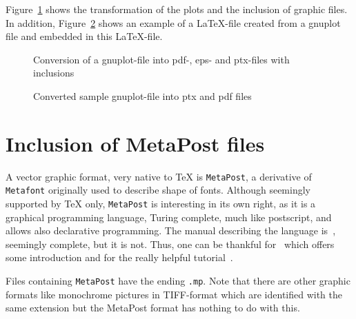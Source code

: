 Figure~\ref{fig:gp2pdf} shows the transformation of the plots 
and the inclusion of graphic files. 
In addition, Figure~\ref{fig:gnuplot} shows an example of a \LaTeX-file 
created from a gnuplot file 
and embedded in this \LaTeX-file. 

\begin{figure}[htb]
\centering
{}
\caption{\label{fig:gp2pdf}Conversion of a gnuplot-file 
into pdf-, eps- and ptx-files with inclusions}
\end{figure}

\begin{figure}[htb]
\centering
{}
\caption{\label{fig:gnuplot}
Converted sample gnuplot-file into ptx and pdf files }
\end{figure}


\section{Inclusion of MetaPost files}\label{sec:metapost}

A vector graphic format, very native to TeX is \texttt{MetaPost}, 
a derivative of \texttt{Metafont} originally used to describe shape of fonts. 
Although seemingly supported by \TeX{} only, 
\texttt{MetaPost} is interesting in its own right, 
as it is a graphical programming language, 
Turing complete, much like postscript, and allows also declarative programming. 
The manual describing the language is~\cite{MPost24}, 
seemingly complete, but it is not. 
Thus, one can be thankful for~\cite{MPostGuid} 
which offers some introduction and for the really helpful tutorial~\cite{MPostTut}. 

Files containing \texttt{MetaPost} have the ending \texttt{.mp}. 
Note that there are other graphic formats 
like monochrome pictures in TIFF-format 
which are identified with the same extension 
but the MetaPost format has nothing to do with this. 

